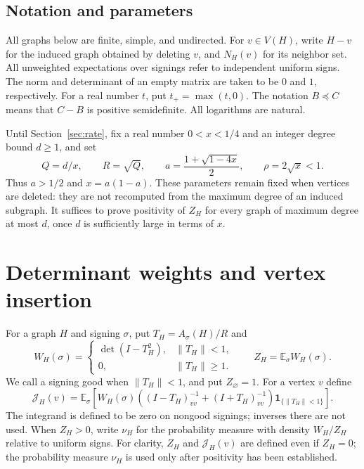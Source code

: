 \documentclass[11pt]{article}
\numberwithin{equation}{section}
\theoremstyle{remark}
\newcommand{\norm}[1]{\left\lVert#1\right\rVert}
\newcommand{\E}{\mathbb E}
\begin{document}
\subsection{Notation and parameters}

All graphs below are finite, simple, and undirected. For
$v\in V(H)$, write $H-v$ for the induced graph obtained by deleting
$v$, and $N_H(v)$ for its neighbor set. All unweighted expectations
over signings refer to independent uniform signs. The norm and
determinant of an empty matrix are taken to be $0$ and $1$,
respectively. For a real number $t$, put $t_+=\max(t,0)$.
The notation $B\preceq C$ means that $C-B$ is positive semidefinite.
All logarithms are natural.

Until Section~\ref{sec:rate}, fix a real number $0<x<1/4$ and an
integer degree bound $d\ge1$, and set
\begin{equation}\label{eq:parameters-basic}
 Q=d/x,\qquad R=\sqrt Q,\qquad
 a=\frac{1+\sqrt{1-4x}}2,\qquad \rho=2\sqrt x<1.
\end{equation}
Thus $a>1/2$ and $x=a(1-a)$. These parameters remain fixed when
vertices are deleted: they are not recomputed from the maximum
degree of an induced subgraph.
It suffices to prove positivity of $Z_H$ for every graph of maximum
degree at most $d$, once $d$ is sufficiently large in terms of $x$.

\section{Determinant weights and vertex insertion}\label{sec:weights}

For a graph $H$ and signing $\sigma$, put $T_H=A_\sigma(H)/R$ and
\[
 W_H(\sigma)=
 \begin{cases}
 \det(I-T_H^2),&\norm{T_H}<1,\\
 0,&\norm{T_H}\ge1.
 \end{cases}
 \qquad Z_H=\E_\sigma W_H(\sigma).
\]
We call a signing good when $\norm{T_H}<1$, and put $Z_\varnothing=1$.
For a vertex $v$ define
\[
 \mathcal J_H(v)=
 \E_\sigma\left[
 W_H(\sigma)\left((I-T_H)^{-1}_{vv}+(I+T_H)^{-1}_{vv}\right)
 \mathbf1_{\{\norm{T_H}<1\}}\right].
\]
The integrand is defined to be zero on nongood signings; inverses
there are not used. When $Z_H>0$, write $\nu_H$ for the probability
measure with density $W_H/Z_H$ relative to uniform signs.
For clarity, $Z_H$ and $\mathcal J_H(v)$ are defined even if
$Z_H=0$; the probability measure $\nu_H$ is used only after
positivity has been established.
\end{document}
